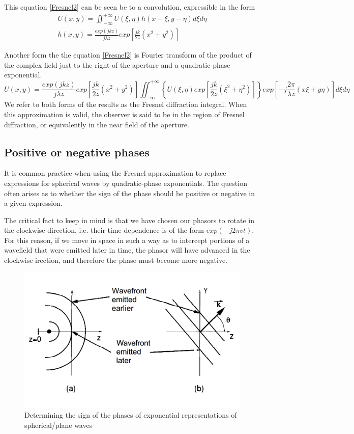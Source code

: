 \documentclass[../main.tex]{subfiles}
\begin{document}
	This equation \ref{Fresnel2} can be seen be to a convolution, expressible in the form
	\begin{align}
	U(x,y)=\iint_{-\infty}^{+\infty} U(\xi,\eta)h(x-\xi,y-\eta)d\xi d\eta\label{convolution}\\
	h(x,y)=\frac{exp(jkz)}{j\lambda z}exp\left[\frac{jk}{2z}(x^2+y^2)\right]\label{quadratic-phase}
	\end{align}

	Another form the the equation \ref{Fresnel2} is Fourier transform of the product of the complex field just to the right of the aperture and a quadratic phase exponential.
	\begin{equation}
	U(x,y)=\frac{exp(jkz)}{j\lambda z}exp\left[\frac{jk}{2z}(x^2+y^2)\right]\iint_{-\infty}^{+\infty} \left\{U(\xi,\eta)exp\left[\frac{jk}{2z}(\xi^2+\eta^2)\right]\right\}exp\left[-j\frac{2\pi}{\lambda z}(x\xi+y\eta)\right]d\xi d\eta\label{Fourierform}
	\end{equation}
	We refer to both forms of the results as the Fresnel diffraction integral. When this approximation is valid, the observer is said to be in the region of Fresnel diffraction, or equivalently in the near field of the aperture.

	\subsection{Positive or negative phases}
	It is common practice when using the Fresnel approximation to replace expressions for spherical waves by quadratic-phase exponentials. The question often arises as to whether the sign of the phase should be positive or negative in a given expression.

	The critical fact to keep in mind is that we have chosen our phasors to rotate in the clockwise direction, i.e. their time dependence is of the form $exp(-j2\pi vt)$. For this reason, if we move in space in such a way as to intercept portions of a wavefield that were emitted later in time, the phasor will have advanced in the clockwise irection, and therefore the phase must become more negative. 

	\begin{figure}[h!]
	  \centering
	  \includegraphics[scale=0.5]{../graphics/Wave_optics6.png}
	  \caption{Determining the sign of the phases of exponential representations of spherical/plane waves}
	  \label{fig:phase}
	\end{figure}
\end{document}
